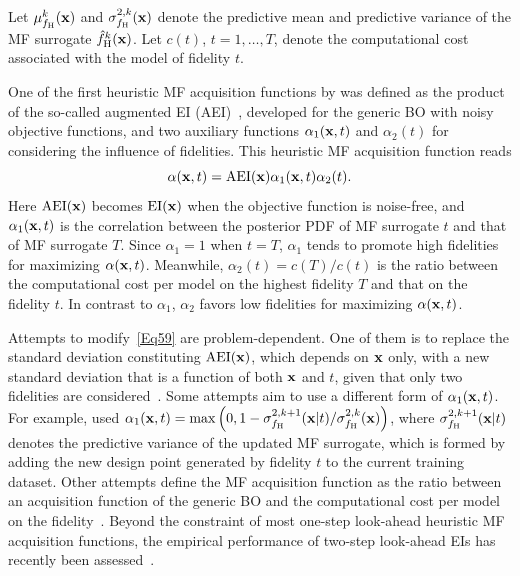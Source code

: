 \documentclass[iicol,sn-basic]{sn-jnl}%
\begin{document}
Let $\mu^k_{f_\text{H}}(\bf x)$ and $\sigma_{f_\text{H}}^{2,k}(\bf x)$ denote the predictive mean and predictive variance of the MF surrogate $\hat{f}_\text{H}^k(\bf x)$.
Let $c(t)$, $t=1,\dots,T$, denote the computational cost associated with the model of fidelity $t$.

One of the first heuristic MF acquisition functions by \cite{Huang2006smo} was defined as the product of the so-called augmented EI (AEI)~\citep{Huang2006jgo}, developed for the generic BO with noisy objective functions, and two auxiliary functions $\alpha_1({\bf x},t)$ and $\alpha_2(t)$ for considering the influence of fidelities.
This heuristic MF acquisition function reads
\begin{equation}\label{Eq59}
	\alpha({\bf x},t) = \text{AEI}({\bf x}) \alpha_1({\bf x},t) \alpha_2(t).
\end{equation}
Here $\text{AEI}({\bf x})$ becomes $\text{EI}({\bf x})$ when the objective function is noise-free, and $\alpha_1({\bf x},t)$ is the correlation between the posterior PDF of MF surrogate $t$ and that of MF surrogate $T$.
Since $\alpha_1 = 1$ when $t=T$, $\alpha_1$ tends to promote high fidelities for maximizing $\alpha({\bf x},t)$. 
Meanwhile, $\alpha_2(t) = c(T)/c(t)$ is the ratio between the computational cost per model on the highest fidelity $T$ and that on the fidelity $t$.
In contrast to $\alpha_1$, $\alpha_2$ favors low fidelities for maximizing $\alpha({\bf x},t)$.

Attempts to modify~\cref{Eq59} are problem-dependent.
One of them is to replace the standard deviation constituting $\text{AEI}({\bf x})$, which depends on ${\bf x}$ only, with a new standard deviation that is a function of both ${\bf x}$ and $t$, given that only two fidelities are considered~\citep{ZhangY2018,Ruan2020}.
Some attempts aim to use a different form of $\alpha_1({\bf x},t)$.
For example, \cite{Sacher2021} used $\alpha_1({\bf x},t) = \max\left(0,1-\sigma_{f_\text{H}}^{2,k+1}({\bf x}|t)/\sigma_{f_\text{H}}^{2,k}({\bf x})\right)$, where $\sigma_{f_\text{H}}^{2,k+1}({\bf x}|t)$ denotes the predictive variance of the updated MF surrogate, which is formed by adding the new design point generated by fidelity $t$ to the current training dataset.  
Other attempts define the MF acquisition function as the ratio between an acquisition function of the generic BO and the computational cost per model on the fidelity~\citep{Winter2023,Foumani2023}.
Beyond the constraint of most one-step look-ahead heuristic MF acquisition functions, the empirical performance of two-step look-ahead EIs has recently been assessed~\citep{Ghoreishi2019,Fiore2023}.
\end{document}
